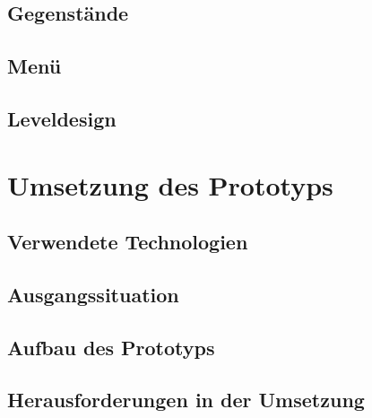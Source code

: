 \section{Gegenstände}

\section{Menü}

\section{Leveldesign}

\chapter{Umsetzung des Prototyps}

\section{Verwendete Technologien}

\section{Ausgangssituation}

\section{Aufbau des Prototyps}

\section{Herausforderungen in der Umsetzung}